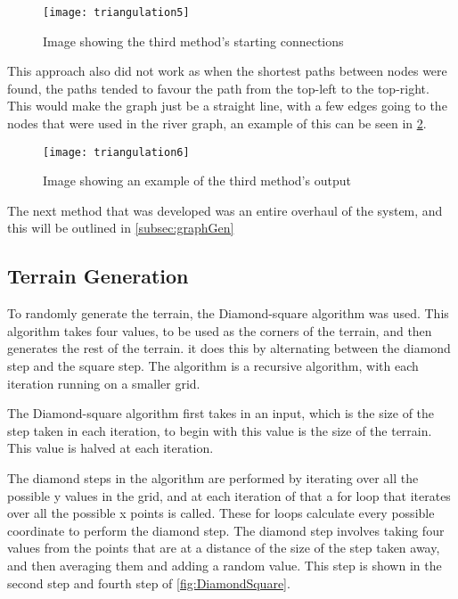 \begin{figure}[H]
	\texttt{[image: triangulation5]}
	\centering
	\caption{Image showing the third method's starting connections}
	\label{fig:triangulation5}
\end{figure}
	
	This approach also did not work as when the shortest paths between nodes were found, the paths tended to favour the path from the top-left to the top-right. This would make the graph just be a straight line, with a few edges going to the nodes that were used in the river graph, an example of this can be seen in \ref{fig:triangulation6}.

\begin{figure}[H]
	\texttt{[image: triangulation6]}
	\centering
	\caption{Image showing an example of the third method's output}
	\label{fig:triangulation6}
\end{figure}

	The next method that was developed was an entire overhaul of the system, and this will be outlined in \ref{subsec:graphGen}

\subsection{Terrain Generation}
	To randomly generate the terrain, the Diamond-square algorithm was used\cite{diamondsquare}. This algorithm takes four values, to be used as the corners of the terrain, and then generates the rest of the terrain. it does this by alternating between the diamond step and the square step. The algorithm is a recursive algorithm, with each iteration running on a smaller grid.
	\newline
	\par
	The Diamond-square algorithm first takes in an input, which is the size of the step taken in each iteration, to begin with this value is the size of the terrain. This value is halved at each iteration.
	\newline
	\par


	The diamond steps in the algorithm are performed by iterating over all the possible y values in the grid, and at each iteration of that a for loop that iterates over all the possible x points is called. These for loops calculate every possible coordinate to perform the diamond step. The diamond step involves taking four values from the points that are at a distance of the size of the step taken away, and then averaging them and adding a random value. This step is shown in the second step and fourth step of \ref{fig:DiamondSquare}.
	\newline
	\par

